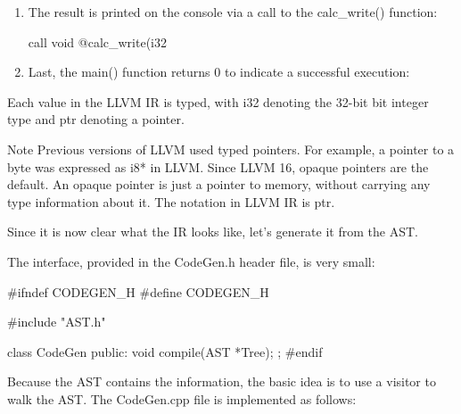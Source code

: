 \begin{enumerate}
\item
The result is printed on the console via a call to the calc\_write() function:

\begin{shell}
    call void @calc_write(i32 %
\end{shell}

\item
Last, the main() function returns 0 to indicate a successful execution:

\begin{shell}
    ret i32 0
}
\end{shell}

\end{enumerate}

Each value in the LLVM IR is typed, with i32 denoting the 32-bit bit integer type and ptr denoting a pointer.

\begin{myNotic}{Note}
Previous versions of LLVM used typed pointers. For example, a pointer to a byte was expressed as i8* in LLVM. Since LLVM 16, opaque pointers are the default. An opaque pointer is just a pointer to memory, without carrying any type information about it. The notation in LLVM IR is ptr.
\end{myNotic}

Since it is now clear what the IR looks like, let’s generate it from the AST.


The interface, provided in the CodeGen.h header file, is very small:

\begin{cpp}
#ifndef CODEGEN_H
#define CODEGEN_H

#include "AST.h"

class CodeGen
{
    public:
    void compile(AST *Tree);
};
#endif
\end{cpp}

Because the AST contains the information, the basic idea is to use a visitor to walk the AST. The CodeGen.cpp file is implemented as follows:

